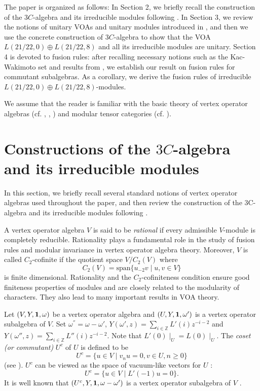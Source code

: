 \documentclass{article}
\def\Z{{\mathbb Z}}
\def\1{{\bf 1}}
\def \w{\omega}
\begin{document}
	The paper is organized as follows: In Section 2, we briefly recall the construction of the $3C$-algebra and its irreducible modules following \cite{LYY}.
	In Section 3, we review the notions of unitary VOAs and  unitary modules introduced in \cite{DLin1}, and then we use the concrete construction of $3C$-algebra to show that the VOA $L(21/22, 0)\oplus L(21/22, 8)$ and all  its irreducible modules are unitary.
	Section 4 is devoted to fusion rules: after recalling necessary notions such as the Kac-Wakimoto set and results from \cite{DRX2}, we establish our result on fusion rules for commutant subalgebras.  As a corollary, we derive the fusion rules of irreducible $L(21/22, 0)\oplus L(21/22, 8)$-modules.
	
	We assume that the reader is familiar with the basic theory of vertex operator algebras (cf. \cite{FHL}, \cite{FLM}, \cite{LL}) and modular tensor categories (cf. \cite{EGNO, KO}).
	
	\section{Constructions of the $3C$-algebra and its irreducible modules}
	In this section, we briefly recall several standard notions of vertex operator algebras used throughout the paper, and then review the construction of the 3C-algebra and its irreducible modules following \cite{LYY}.
	
	A vertex operator algebra $V$ is said to be \emph{rational} if every admissible $V$-module is completely reducible. Rationality plays a fundamental role in the study of fusion rules and modular invariance in vertex operator algebra theory. Moreover, $V$ is called $C_2$-cofinite if the quotient space $V/{C_2(V)}$ where $$C_2(V)=\text{span}\{u_{-2}v\mid u,v\in V\}$$ is finite dimensional.
	Rationality and the $C_2$-cofiniteness condition ensure good finiteness properties of modules and are closely related to the modularity of characters. They also lead to many important results in VOA theory.
	
	
	Let $(V, Y, \1, \w)$ be a vertex operator algebra and
	$(U, Y, \1, \w')$ is a vertex operator subalgebra of $V$. Set $\w^{''}=\w-\w'$, $Y(\w',z)=\sum_{i\in \Z}L'(i)z^{-i-2} $ and $Y(\w'',z)=\sum_{i\in \Z}L''(i)z^{-i-2}$. Note that $L'(0)\mid_U=L(0)\mid_U$. The \emph{coset (or commutant)} $U^c$ of $U$ is defined to be
	$$U^c=\{u\in V\mid v_n u=0, v\in U,n\geq 0\}$$
	(see \cite{FZ}). $U^c$ can be viewed as the space of vacuum-like vectors for $U$ \cite{L1}:
	$$U^c=\{u\in V\mid L'(-1)u=0\}.$$
	It is well known that $(U^c, Y, \1, \w-\w')$ is a vertex operator subalgebra of
	$V$ \cite{FZ,LL}.
	
\end{document}
